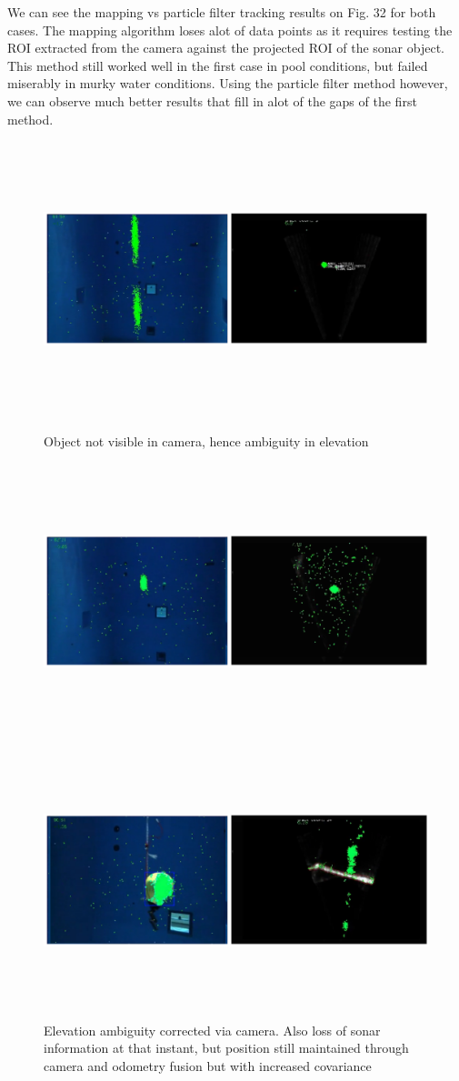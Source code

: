 \documentclass[a4paper]{IEEEtran}
\begin{document}
We can see the mapping vs particle filter tracking results on Fig. 32 for both cases. The mapping algorithm loses alot of data points as it requires testing the ROI extracted from the camera against the projected ROI of the sonar object. This method still worked well in the first case in pool conditions, but failed miserably in murky water conditions. Using the particle filter method however, we can observe much better results that fill in alot of the gaps of the first method.

\begin{figure}
  \includegraphics[width=\textwidth,height=8cm]{pfraw3}
  \caption{Object not visible in camera, hence ambiguity in elevation}
  \includegraphics[width=\textwidth,height=8cm]{pfraw4}
  \captionsetup{font=small,skip=-10pt,justification=centering}
  \caption{Elevation ambiguity corrected via camera. Also loss of sonar information at that instant, but position still maintained through camera and odometry fusion but with increased covariance}
  \includegraphics[width=\textwidth,height=8cm]{pfraw5}

\end{figure}
\end{document}
